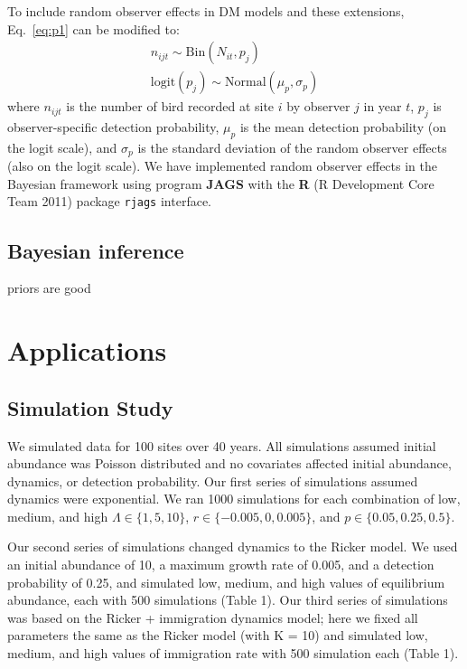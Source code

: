 \documentclass[12pt]{article}
\begin{document}
To include random observer effects in DM models and these extensions,
Eq.~\ref{eq:p1} can be modified to:
\begin{gather}
n_{ijt} \sim \mathrm{Bin}(N_{it}, p_j) \nonumber \\
\mathrm{logit}(p_j) \sim \mathrm{Normal}(\mu_p, \sigma_p)
\label{eq:pobs}
\end{gather}
where $n_{ijt}$ is the number of bird recorded at site $i$ by observer $j$ in
year $t$, $p_j$ is observer-specific detection probability, $\mu_p$ is the mean
detection probability (on the logit scale), and $\sigma_p$ is the standard
deviation of the random observer effects (also on the logit scale).
We have implemented random observer effects in the Bayesian framework
using program \textbf{JAGS} \citep[version 3.2.0]{plummer:2003}
with the \textbf{R} (R
Development Core Team 2011) package \texttt{rjags} \citep{plummer:2011}
interface.


\subsection{Bayesian inference}

priors are good

\section{Applications}
\label{sec:app}

\subsection{Simulation Study}


We simulated data for 100 sites over 40 years.  All
simulations assumed initial abundance was Poisson distributed
and no covariates affected initial abundance, dynamics, or
detection probability.  Our first series of simulations
assumed dynamics were exponential.  We ran 1000 simulations for
each combination of low, medium, and high $\Lambda \in \{1,5,10\}$, $r
\in \{-0.005, 0, 0.005\}$, and
$p \in \{0.05, 0.25, 0.5\}$. %

Our second series of simulations changed dynamics to the
Ricker model.  We used an initial abundance of 10, a maximum
growth rate of 0.005, and a detection probability of 0.25, and
simulated low, medium, and high values of equilibrium
abundance, each with 500 simulations (Table 1).  Our third
series of simulations was based on the Ricker + immigration
dynamics model; here we fixed all parameters the same as the
Ricker model (with K = 10) and simulated low, medium, and high
values of immigration rate with 500 simulation each (Table
1).
\end{document}
